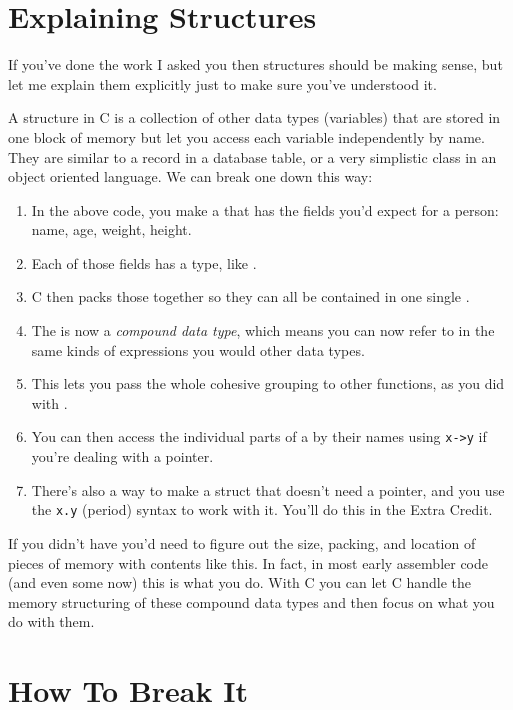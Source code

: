 \section{Explaining Structures}

If you've done the work I asked you then structures should be
making sense, but let me explain them explicitly just to make
sure you've understood it.

A structure in C is a collection of other data types (variables)
that are stored in one block of memory but let you access each
variable independently by name.  They are similar to a record
in a database table, or a very simplistic class in an object
oriented language.  We can break one down this way:

\begin{enumerate}
\item In the above code, you make a  that has the fields 
    you'd expect for a person: name, age, weight, height.
\item Each of those fields has a type, like .
\item C then packs those together so they can all be contained in 
    one single .
\item The  is now a \emph{compound data type}, which
    means you can now refer to  in the same kinds
    of expressions you would other data types.
\item This lets you pass the whole cohesive grouping to other
    functions, as you did with .
\item You can then access the individual parts of a
     by their names using \verb|x->y| if you're
    dealing with a pointer.
\item There's also a way to make a struct that doesn't need
    a pointer, and you use the \verb|x.y| (period) syntax
    to work with it.  You'll do this in the Extra Credit.
\end{enumerate}

If you didn't have  you'd need to figure out
the size, packing, and location of pieces of memory with
contents like this.  In fact, in most early assembler code
(and even some now) this is what you do.  With C you can 
let C handle the memory structuring of these compound data types
and then focus on what you do with them.


\section{How To Break It}

